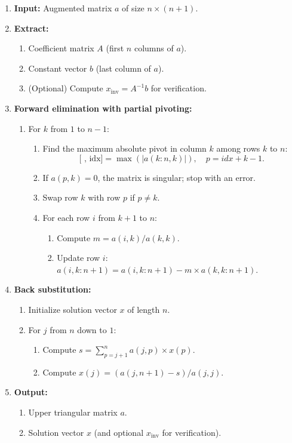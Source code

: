 \documentclass[a4paper,12pt]{article}
\begin{document}
	\begin{enumerate}
		\item \textbf{Input:} Augmented matrix $a$ of size $n\times(n+1)$.  
		\item \textbf{Extract:}
		\begin{enumerate}
			\item Coefficient matrix $A$ (first $n$ columns of $a$).
			\item Constant vector $b$ (last column of $a$).
			\item (Optional) Compute $x_{\mathrm{inv}} = A^{-1}b$ for verification.
		\end{enumerate}
		\item \textbf{Forward elimination with partial pivoting:}
		\begin{enumerate}
			\item For $k$ from $1$ to $n-1$:
			\begin{enumerate}
				\item Find the maximum absolute pivot in column $k$ among rows $k$ to $n$:
				\[\text{[~, idx]} = \max(|a(k:n,k)|), \quad p = idx + k - 1.
				\]
				\item If $a(p,k) = 0$, the matrix is singular; stop with an error.
				\item Swap row $k$ with row $p$ if $p \neq k$.
				\item For each row $i$ from $k+1$ to $n$:
				\begin{enumerate}
					\item Compute $m = a(i,k) / a(k,k)$.
					\item Update row $i$: $a(i,k:n+1) = a(i,k:n+1) - m \times a(k,k:n+1)$.
				\end{enumerate}
			\end{enumerate}
		\end{enumerate}
		\item \textbf{Back substitution:}
		\begin{enumerate}
			\item Initialize solution vector $x$ of length $n$.
			\item For $j$ from $n$ down to $1$:
			\begin{enumerate}
				\item Compute $s = \sum_{p=j+1}^{n} a(j,p) \times x(p).$
				\item Compute $x(j) = (a(j,n+1) - s) / a(j,j)$.
			\end{enumerate}
		\end{enumerate}
		\item \textbf{Output:}
		\begin{enumerate}
			\item Upper triangular matrix $a$.
			\item Solution vector $x$ (and optional $x_{\mathrm{inv}}$ for verification).
		\end{enumerate}
	\end{enumerate}
	\newpage
\end{document}
